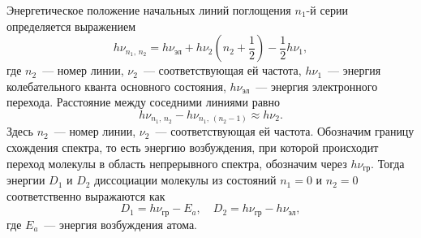 Энергетическое положение начальных линий поглощения $n_1$-й серии определяется выражением
\begin{equation}\label{iodine1}
    h\nu_{n_1,\,n_2} = h\nu_\text{эл} + h\nu_2\left(n_2 + \frac{1}{2}\right) - \frac{1}{2}h\nu_1,
\end{equation}
где $n_2$~--- номер линии, $\nu_2$~--- соответствующая ей частота, $h\nu_1$~--- энергия колебательного кванта основного состояния, $h\nu_\text{эл}$~--- энергия электронного перехода. Расстояние между соседними линиями равно
\begin{equation}\label{iodine2}
    h\nu_{n_1,\,n_2} - h\nu_{n_1,\,(n_2 - 1)} \approx h\nu_2. 
\end{equation}
Здесь $n_2$~--- номер линии, $\nu_2$~--- соответствующая ей частота. Обозначим границу схождения спектра, то есть энергию возбуждения, при которой происходит переход молекулы в область непрерывного спектра, обозначим через $h\nu_\text{гр}$. Тогда энергии $D_1$ и $D_2$ диссоциации молекулы из состояний $n_1 = 0$ и $n_2 = 0$ соответственно выражаются как
\begin{equation}\label{iodine3}
    D_1 = h\nu_\text{гр} - E_a,\quad D_2 = h\nu_\text{гр} - h\nu_\text{эл},
\end{equation}
где $E_a$~--- энергия возбуждения атома.
